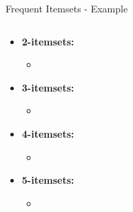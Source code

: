 \begin{frame}{Frequent Itemsets - Example}
\begin{columns}
\begin{column}{0.5\textwidth}
\begin{itemize}
\begin{itemize}
\begin{itemize}
						            \item {}
					            \end{itemize}
					      \item \textbf{2-itemsets:}
					            \begin{itemize}
						            \item {}
					            \end{itemize}
					      \item \textbf{3-itemsets:}
					            \begin{itemize}
						            \item {}
					            \end{itemize}
					      \item \textbf{4-itemsets:}
					            \begin{itemize}
						            \item {}
					            \end{itemize}
					      \item \textbf{5-itemsets:}
					            \begin{itemize}
						            \item {}
					            \end{itemize}
				      \end{itemize}
			\end{itemize}
		\end{column}
	\end{columns}
\end{frame}

